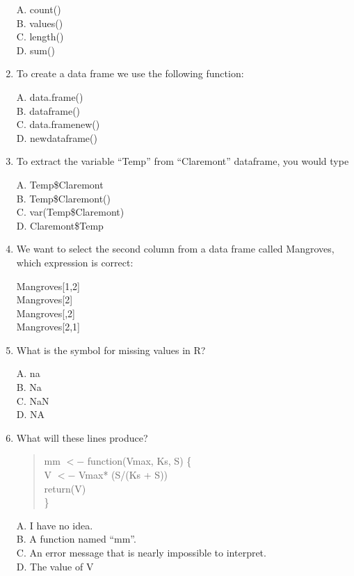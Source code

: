 \documentclass[12pt]{article}\usepackage[]{graphicx}\usepackage[]{color}
\begin{document}
\begin{enumerate}
A. count() \\
B. values() \\
C. length() \\
D. sum() \\

\item To create a data frame we use the following function:

A. data.frame() \\
B. dataframe() \\
C. data.framenew()\\
D. newdataframe() \\

\item To extract the variable ``Temp'' from ``Claremont'' dataframe, you would type

A. Temp\$Claremont \\
B. Temp\$Claremont() \\
C. var(Temp\$Claremont)\\
D. Claremont\$Temp \\

\item We want to select the second column from a data frame called Mangroves, which expression is correct:

Mangroves[1,2] \\
Mangroves[2] \\
Mangroves[,2] \\
Mangroves[2,1] 

\item What is the symbol for missing values in R?

A. na \\
B. Na \\
C. NaN \\
D. NA 

\item What will these lines produce?

\begin{quote}
mm $<-$ function(Vmax, Ks, S) \{\\
V $<-$ Vmax* (S/(Ks + S)) \\
return(V)\\
\}

\end{quote}
 
A. I have no idea. \\
B. A function named ``mm''. \\
C. An error message that is nearly impossible to interpret. \\
D. The value of V 


\end{enumerate}
\end{document}

